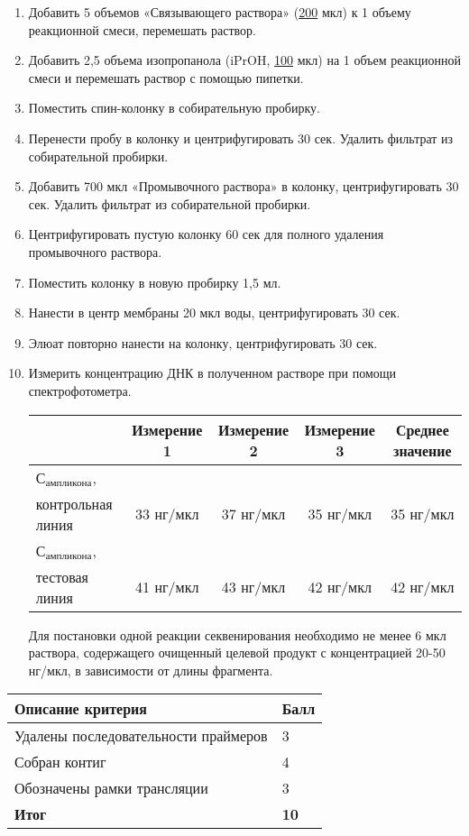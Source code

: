 \begin{enumerate}
    \item Добавить 5 объемов «Связывающего раствора» (\underline{200} мкл) к 1 объему реакционной смеси, перемешать раствор.
    \item Добавить 2,5 объема изопропанола (iPrOH, \underline{100} мкл) на 1 объем реакционной смеси и перемешать раствор с помощью пипетки.
    \item Поместить спин-колонку в собирательную пробирку.
    \item Перенести пробу в колонку и центрифугировать 30 сек. Удалить фильтрат из собирательной пробирки.
    \item Добавить 700 мкл «Промывочного раствора» в колонку, центрифугировать 30 сек. Удалить фильтрат из собирательной пробирки.
    \item Центрифугировать пустую колонку 60 сек для полного удаления промывочного раствора.
    \item Поместить колонку в новую пробирку 1,5 мл.
    \item Нанести в центр мембраны 20 мкл воды, центрифугировать 30 сек.
    \item Элюат повторно нанести на колонку, центрифугировать 30 сек.
    \item Измерить концентрацию ДНК в полученном растворе при помощи спектрофотометра.
 
    \begin{tabular}{|l|c|c|c|c|}
        \hline
        & Измерение 1 & Измерение 2 & Измерение 3 & Среднее значение \\
        \hline
        $\text{С}_\text{ампликона}$,& & & & \\ 
        контрольная линия & 33 нг/мкл & 37 нг/мкл & 35 нг/мкл & 35 нг/мкл \\
        \hline
        $\text{С}_\text{ампликона}$, & & & & \\ 
        тестовая линия & 41 нг/мкл & 43 нг/мкл & 42 нг/мкл & 42 нг/мкл \\
        \hline
    \end{tabular}    

    \explanationSection
    
    Для постановки одной реакции секвенирования необходимо не менее 6 мкл раствора, содержащего очищенный целевой продукт с концентрацией 20-50 нг/мкл, в зависимости от длины фрагмента.
\end{enumerate}

\markSection

\begin{tabular}{|p{11cm}|p{3cm}|}
    \hline
    \textbf{Описание критерия} & \textbf{Балл} \\
    \hline
    \hline
    Удалены последовательности праймеров & 3 \\
    Собран контиг & 4 \\
    Обозначены рамки трансляции & 3 \\
    \hline
    \hline
    \textbf{Итог} & \textbf{10} \\
    \hline
\end{tabular}